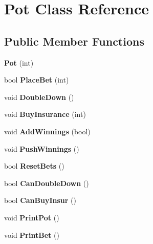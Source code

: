 \hypertarget{class_pot}{}\section{Pot Class Reference}
\label{class_pot}
\subsection*{Public Member Functions}
\begin{DoxyCompactItemize}
\item 
{\bfseries Pot} (int)\hypertarget{class_pot_ae1fecaba6730af51a13cf57726f2e304}{}\label{class_pot_ae1fecaba6730af51a13cf57726f2e304}

\item 
bool {\bfseries Place\+Bet} (int)\hypertarget{class_pot_a9932b87968829937f62d7dd60e11046e}{}\label{class_pot_a9932b87968829937f62d7dd60e11046e}

\item 
void {\bfseries Double\+Down} ()\hypertarget{class_pot_afccb26a065de8c5192acd72b1dff217d}{}\label{class_pot_afccb26a065de8c5192acd72b1dff217d}

\item 
void {\bfseries Buy\+Insurance} (int)\hypertarget{class_pot_a5e1e06ffa0cd7a74087297a84cfeb17f}{}\label{class_pot_a5e1e06ffa0cd7a74087297a84cfeb17f}

\item 
void {\bfseries Add\+Winnings} (bool)\hypertarget{class_pot_afa6a1574446fdc8fb3450095e6586944}{}\label{class_pot_afa6a1574446fdc8fb3450095e6586944}

\item 
void {\bfseries Push\+Winnings} ()\hypertarget{class_pot_a9e3e905d1cf6759db2105dabf22fc454}{}\label{class_pot_a9e3e905d1cf6759db2105dabf22fc454}

\item 
bool {\bfseries Reset\+Bets} ()\hypertarget{class_pot_a7ec1ff4578b4cec267e652876297897f}{}\label{class_pot_a7ec1ff4578b4cec267e652876297897f}

\item 
bool {\bfseries Can\+Double\+Down} ()\hypertarget{class_pot_af6a1e26563014a493c1fd6b0c7d1f48e}{}\label{class_pot_af6a1e26563014a493c1fd6b0c7d1f48e}

\item 
bool {\bfseries Can\+Buy\+Insur} ()\hypertarget{class_pot_a7e13e6cdb743259fdb3784ec1272ab98}{}\label{class_pot_a7e13e6cdb743259fdb3784ec1272ab98}

\item 
void {\bfseries Print\+Pot} ()\hypertarget{class_pot_a1c3fde3bd8e004664efb06846ead92fc}{}\label{class_pot_a1c3fde3bd8e004664efb06846ead92fc}

\item 
void {\bfseries Print\+Bet} ()\hypertarget{class_pot_a770efd0511771dea454510cb89be354b}{}\label{class_pot_a770efd0511771dea454510cb89be354b}

\end{DoxyCompactItemize}
